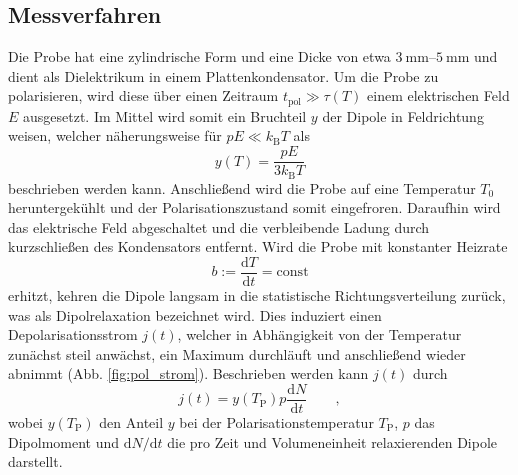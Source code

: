 \subsection{Messverfahren} %
\label{sub:messverfahren}

Die Probe hat eine zylindrische Form und eine Dicke von etwa $\SIrange{3}{5}{\milli\meter}$ und dient als Dielektrikum in einem Plattenkondensator.
Um die Probe zu polarisieren, wird diese über einen Zeitraum $t_{\text{pol}} \gg \tau(T)$ einem elektrischen Feld $E$ ausgesetzt.
Im Mittel wird somit ein Bruchteil $y$ der Dipole in Feldrichtung weisen, welcher näherungsweise für $pE \ll k_\text{B} T$ als
\begin{equation}
    y(T) = \frac{p E}{3 k_\text{B} T} \label{y_t}
\end{equation}
beschrieben werden kann.
Anschließend wird die Probe auf eine Temperatur $T_0$ heruntergekühlt und der Polarisationszustand somit eingefroren.
Daraufhin wird das elektrische Feld abgeschaltet und die verbleibende Ladung durch kurzschließen des Kondensators entfernt.
Wird die Probe mit konstanter Heizrate
\begin{equation}
    b := \frac{\mathrm{d}T}{\mathrm{d}t} = \text{const}
\end{equation}
erhitzt, kehren die Dipole langsam in die statistische Richtungsverteilung zurück, was als Dipolrelaxation bezeichnet wird.
Dies induziert einen Depolarisationsstrom $j(t)$, welcher in Abhängigkeit von der Temperatur zunächst steil anwächst, ein Maximum durchläuft und anschließend wieder abnimmt (Abb. \ref{fig:pol_strom}).
Beschrieben werden kann $j(t)$ durch
\begin{equation}
    j(t) = y(T_\mathrm{P}) p \frac{\mathrm{d}N}{\mathrm{d}t} \qquad,
\end{equation}
wobei $y(T_\mathrm{P})$ den Anteil $y$ bei der Polarisationstemperatur $T_\mathrm{P}$, $p$ das Dipolmoment und $\mathrm{d}N/\mathrm{d}t$ die pro Zeit und Volumeneinheit relaxierenden Dipole darstellt.

